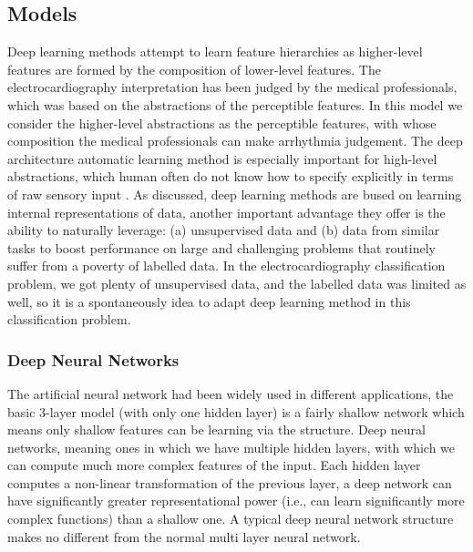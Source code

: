 \documentclass[journal]{IEEEtran}
\begin{document}
\subsection{Models}
Deep learning methods attempt to learn feature hierarchies as higher-level features are formed by the composition of lower-level features. The electrocardiography interpretation has been judged by the medical professionals, which was based on the abstractions of the perceptible features. In this model we consider the higher-level abstractions as the perceptible features, with whose composition the medical professionals can make arrhythmia judgement. The deep architecture automatic learning method is especially important for high-level abstractions, which human often do not know how to specify explicitly in terms of raw sensory input \cite{erhan}. As \cite{collobert} discussed, deep learning methods are bused on learning internal representations of data, another important advantage they offer is the ability to naturally leverage: (a) unsupervised data and (b) data from similar tasks to boost performance on large and challenging problems that routinely suffer from a poverty of labelled data. In the electrocardiography classification problem, we got plenty of unsupervised data, and the labelled data was limited as well, so it is a spontaneously idea to adapt deep learning method in this classification problem.


\subsubsection{Deep Neural Networks}
The artificial neural network had been widely used in different applications, the basic 3-layer model (with only one hidden layer) is a fairly shallow network which means only shallow features can be learning via the structure. Deep neural networks, meaning ones in which we have multiple hidden layers, with which we can compute much more complex features of the input. Each hidden layer computes a non-linear transformation of the previous layer, a deep network can have significantly greater representational power (i.e., can learn significantly more complex functions) than a shallow one. A typical deep neural network structure makes no different from the normal multi layer neural network.
\end{document}
